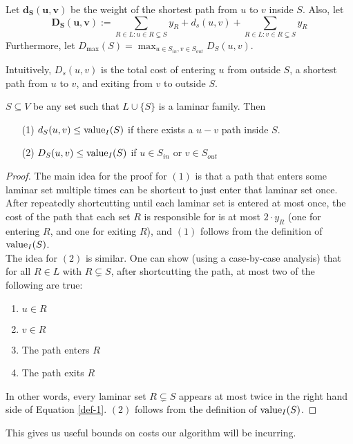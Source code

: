 \begin{definition} Let $\bm{d_S(u,v)}$ be the weight of the shortest path from $u$ to $v$ inside $S$. Also, let \begin{equation}\bm{D_S(u,v)}:=\sum_{R\in L : u\in R\subsetneq S}y_R + d_s(u,v) + \sum_{R\in L : v\in R\subsetneq S}y_R\label{def-1}\end{equation}
Furthermore, let $D_{\max}(S) = \max_{u \in S_{in}, v \in S_{out}}D_S(u,v)$.
\end{definition}
Intuitively, $D_s(u,v)$ is the total cost of entering $u$ from outside $S$, a shortest path from $u$ to $v$, and exiting from $v$ to outside $S$.\vspace{2mm}
\begin{lemma}\label{lemm:2:D-val} $S\subseteq V$ be any set such that $L\cup \{S\}$ is a laminar family. Then\begin{enumerate}
\item[(1)] $d_S(u,v)\leq \textup{value}_I(S)$ if there exists a $u-v$ path inside $S$.
\item[(2)] $D_S(u,v)\leq \textup{value}_I(S)$ if $u\in S_{in}$ or $v\in S_{out}$
\end{enumerate}
\end{lemma}
\begin{proof}
The main idea for the proof for $(1)$ is that a path that enters some laminar set multiple times can be shortcut to just enter that laminar set once. After repeatedly shortcutting until each laminar set is entered at most once, the cost of the path that each set $R$ is responsible for is at most $2\cdot y_R$ (one for entering $R$, and one for exiting $R$), and $(1)$ follows from the definition of $\textup{value}_I(S)$.\vspace{2mm}
\\The idea for $(2)$ is similar. One can show (using a case-by-case analysis) that for all $R\in L$ with $R\subsetneq S$, after shortcutting the path, at most two of the following are true:
\begin{enumerate}
\item $u\in R$
\item $v\in R$
\item The path enters $R$
\item The path exits $R$
\end{enumerate}
In other words, every laminar set $R\subsetneq S$ appears at most twice in the right hand side of Equation \ref{def-1}. $(2)$ follows from the definition of $\textup{value}_I(S)$.
\end{proof}\vspace{2mm}
This gives us useful bounds on costs our algorithm will be incurring.
